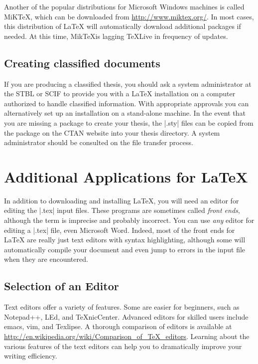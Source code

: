 Another of the popular distributions for Microsoft Windows machines
is called MiK\TeX, which can be downloaded from
\url{http://www.miktex.org/}.  In most cases, this distribution of
\LaTeX{} will automatically download additional packages if needed.
At this time, Mik\TeX is lagging \TeX Live in frequency of updates.

\subsection{Creating classified documents}
If you are producing a classified thesis, you should ask a
system administrator at the STBL or SCIF to provide you with a
\LaTeX{} installation on a computer authorized to handle classified
information. With appropriate approvals you can alternatively set up an
installation on a stand-alone machine.
In the event that you are missing a package to create your thesis, the |.sty| files can be copied from the package on the CTAN website into your thesis directory.  A system administrator should be consulted on the file transfer process.  

\section{Additional Applications for \LaTeX{} }

In addition to downloading and installing \LaTeX, you will need an
editor for editing the |.tex| input files. These programs are
sometimes called \emph{front ends}, although the term is imprecise and
probably incorrect. You can use \emph{any} editor for editing a |.tex|
file, even Microsoft Word. Indeed, most of the front ends for \LaTeX{} 
are really just text editors with syntax highlighting, although some
will automatically compile your document and even jump to errors in
the input file when they are encountered.

\subsection{Selection of an Editor}
Text editors offer a variety of features.  Some are easier for beginners,
 such as Notepad++, LEd, and TeXnicCenter.  Advanced editors for skilled users
 include emacs, vim, and Texlipse.  A thorough comparison of editors 
 is available at
 \url{http://en.wikipedia.org/wiki/Comparison_of_TeX_editors}.  Learning about the various
 features of the text editors can help you to dramatically improve your writing efficiency.

